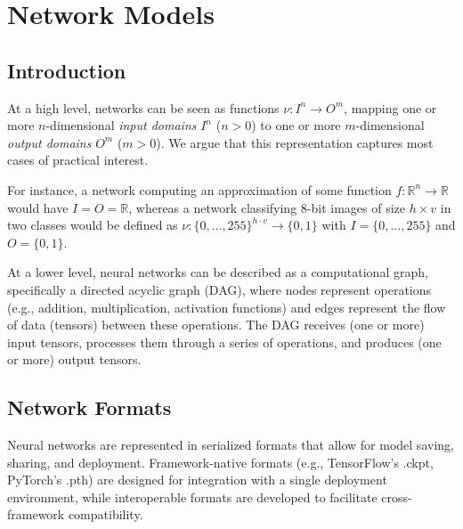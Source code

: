 \chapter{Network Models}
\label{sec:model}

\section{Introduction}
\label{sec:model_intro}
At a high level, networks can be seen as functions 
$\nu : I^n \to O^m$, mapping one or more $n$-dimensional \emph{input domains}
$I^n$ ($n > 0$) to one or more $m$-dimensional \emph{output domains} $O^m$ ($m>0$). 
We argue that this representation captures most cases of practical
interest.

For instance, a network computing an approximation
of some function $f: \mathbb{R}^n \to \mathbb{R}$ would have $I = O =
\mathbb{R}$, whereas a network classifying 8-bit images of size $h \times v$ in
two classes would be defined as ${\nu: \{0,\ldots,255\}^{h \cdot v}
\to \{0, 1\}}$ with $I=\{0, \ldots, 255\}$ and $O = \{0,1\}$.

At a lower level, neural networks can be described as a computational graph, specifically a directed acyclic graph (DAG), where nodes represent operations 
(e.g., addition, multiplication, activation functions) and edges represent the flow of data (tensors) between these operations. The DAG receives (one or more) input tensors, 
processes them through a series of operations, and produces (one or more) output tensors.

\section{Network Formats}
\label{sec:model_formats}
Neural networks are represented in serialized formats that allow for model saving, sharing, and deployment. Framework-native formats (e.g., TensorFlow's .ckpt, PyTorch's .pth) are 
designed for integration with a single deployment environment, while interoperable formats are developed to facilitate cross-framework compatibility. 

